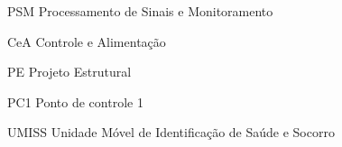 \begin{siglas}
  \item[PSM] Processamento de Sinais e Monitoramento
  \item[CeA] Controle e Alimentação
  \item[PE] Projeto Estrutural
  \item[PC1] Ponto de controle 1
  \item[UMISS] Unidade Móvel de Identificação de Saúde e Socorro
\end{siglas}
